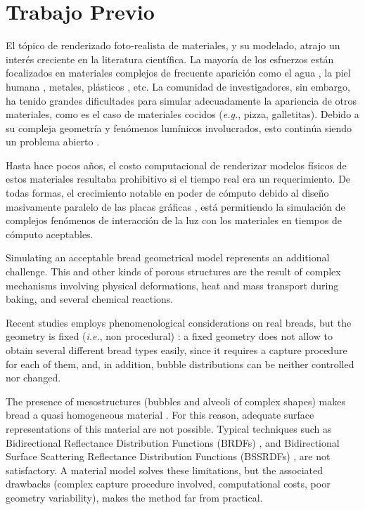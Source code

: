 \section{Trabajo Previo}
El tópico de renderizado foto-realista de materiales, y su modelado, atrajo un interés creciente en la literatura científica.
La mayoría de los esfuerzos están focalizados en materiales complejos de frecuente aparición como el agua \cite{Schechter2012}, la piel humana \cite{Donner2006}, metales, plásticos \cite{Kurt2010}, etc.
La comunidad de investigadores, sin embargo, ha tenido grandes dificultades para simular adecuadamente la apariencia de otros materiales, como es el caso de materiales cocidos ({\em e.g.}, pizza, galletitas).
Debido a su compleja geometría y fenómenos lumínicos involucrados, esto continúa siendo un problema abierto \cite{Voglsam2013}.

Hasta hace pocos años, el costo computacional de renderizar modelos físicos de estos materiales resultaba prohibitivo si el tiempo real era un requerimiento.
De todas formas, el crecimiento notable en poder de cómputo debido al diseño masivamente paralelo de las placas gráficas \cite{Yeo09,Harris06}, está permitiendo la simulación de complejos fenómenos de interacción de la luz con los materiales en tiempos de cómputo aceptables.

Simulating an acceptable bread geometrical model represents an additional challenge.
This and other kinds of porous structures are the result of complex mechanisms involving physical deformations, heat and mass transport during baking, and several chemical reactions.

Recent studies employs phenomenological considerations on real breads, but the geometry is fixed ({\em i.e.}, non procedural) \cite{VanDyck2014}: a fixed geometry does not allow to obtain several different bread types easily, since it requires a capture procedure for each of them, and, in addition, bubble distributions can be neither controlled nor changed.


The presence of mesostructures (bubbles and alveoli of complex shapes) makes bread a quasi homogeneous material \cite{Tong2005}. 
For this reason, adequate surface representations of this material are not possible.
Typical techniques such as Bidirectional Reflectance Distribution Functions (BRDFs)
\cite{Kurt2009}, and Bidirectional Surface Scattering Reflectance Distribution Functions (BSSRDFs) \cite{Donner2009}, are not satisfactory.
A material model \cite{Tong2005} solves these limitations, but the associated drawbacks (complex capture procedure involved, computational costs, poor geometry variability),
makes the method far from practical.

